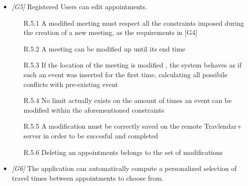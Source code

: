 \begin{itemize}
\begin{itemize}
                  \end{itemize}
                  
\item \textit{[G5]} Registered Users can edit appointments.

                  \begin{itemize}
                       \item  [R.5.1] A modified meeting must respect all the constraints imposed during the creation of a new meeting, as the requirements in [G4]
                       \item [R.5.2] A meeting can be modified up until its end time
                       \item [R.5.3] If the location of the meeting is modified , the system behaves as if such an event was inserted for the first time, calculating all possibile conflicts with pre-existing event
                       \item [R.5.4] No limit actually exists on the amount of times an event can be modified within the aforementioned constraints 
                       \item [R.5.5] A modification must be correctly saved on the remote Travlendar+ server in order to be succesful and completed              
                       \item [R.5.6] Deleting an appointments belongs to the set of modifications

                 \end{itemize}

\item \textit{[G6]} The application can automatically compute a personalized selection of travel times between appointments to choose from.


\end{itemize}
